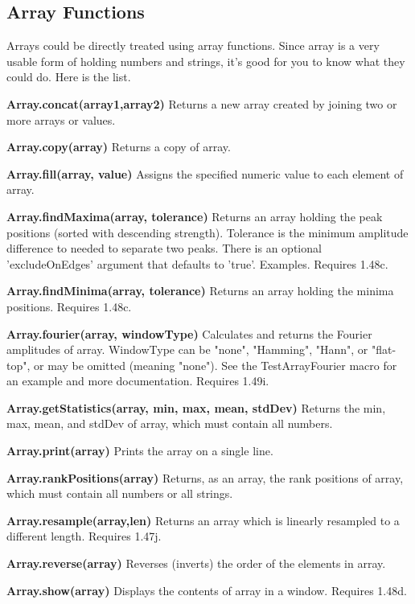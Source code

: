 \subsection{Array Functions}

Arrays could be directly treated using array functions. Since array is a very usable form of holding numbers and strings, it's good for you to know what they could do. Here is the list. 

\begin{shaded}\begin{indentCom}
\item \textbf{Array.concat(array1,array2)} Returns a new array created by
joining two or more arrays or values. 
\item \textbf{Array.copy(array)} Returns a copy of array. 
\item \textbf{Array.fill(array, value)} Assigns the specified numeric value to
each element of array.
\item \textbf{Array.findMaxima(array, tolerance)} Returns an array holding the peak positions (sorted with descending strength). Tolerance is the minimum amplitude difference to needed to separate two peaks. There is an optional 'excludeOnEdges' argument that defaults to 'true'. Examples. Requires 1.48c.
\item \textbf{Array.findMinima(array, tolerance)} Returns an array holding the minima positions. Requires 1.48c.
\item \textbf{Array.fourier(array, windowType)} Calculates and returns the Fourier amplitudes of array. WindowType can be "none", "Hamming", "Hann", or "flat-top", or may be omitted (meaning "none"). See the TestArrayFourier macro for an example and more documentation. Requires 1.49i. 
\item \textbf{Array.getStatistics(array, min, max, mean, stdDev)} Returns the
min, max, mean, and stdDev of array, which must contain all numbers.
\item \textbf{Array.print(array)} Prints the array on a single line. 
\item \textbf{Array.rankPositions(array)} Returns, as an array, the rank
positions of array, which must contain all numbers or all strings. 
\item \textbf{Array.resample(array,len)} Returns an array which is linearly resampled to a different length. Requires 1.47j. 
\item \textbf{Array.reverse(array)} Reverses (inverts) the order of the
elements in array. 
\item \textbf{Array.show(array)} Displays the contents of array in a window. Requires 1.48d.

\end{indentCom}
\end{shaded}
